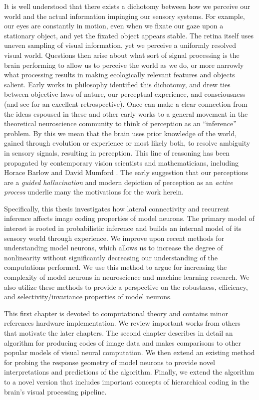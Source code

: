 It is well understood that there exists a dichotomy between how we perceive our world and the actual information impinging our sensory systems. For example, our eyes are constantly in motion, even when we fixate our gaze upon a stationary object, and yet the fixated object appears stable. The retina itself uses uneven sampling of visual information, yet we perceive a uniformly resolved visual world. Questions then arise about what sort of signal processing is the brain performing to allow us to perceive the world as we do, or more narrowly what processing results in making ecologically relevant features and objects salient. Early works in philosophy identified this dichotomy, and drew ties between objective laws of nature, our perceptual experience, and consciousness \cite{kant1790critique, helmholtz1878facts} (and see \cite{westheimer2008helmholtz} for an excellent retrospective). Once can make a clear connection from the ideas espoused in these and other early works to a general movement in the theoretical neuroscience community to think of perception as an ``inference'' problem. By this we mean that the brain uses prior knowledge of the world, gained through evolution or experience or most likely both, to resolve ambiguity in sensory signals, resulting in perception. This line of reasoning has been propagated by contemporary vision scientists and mathematicians, including Horace Barlow \citealt{barlow2001redundancy} and David Mumford \citealt{mumford1994pattern}. The early suggestion that our perceptions are a \textit{guided hallucination} and modern depiction of perception as an \textit{active process} underlie many the motivations for the work herein.

Specifically, this thesis investigates how lateral connectivity and recurrent inference affects image coding properties of model neurons. The primary model of interest is rooted in probabilistic inference and builds an internal model of its sensory world through experience. We improve upon recent methods for understanding model neurons, which allows us to increase the degree of nonlinearity without significantly decreasing our understanding of the computations performed. We use this method to argue for increasing the complexity of model neurons in neuroscience and machine learning research. We also utilize these methods to provide a perspective on the robustness, efficiency, and selectivity/invariance properties of model neurons.

This first chapter is devoted to computational theory and contains minor references hardware implementation. We review important works from others that motivate the later chapters. The second chapter describes in detail an algorithm for producing codes of image data and makes comparisons to other popular models of visual neural computation. We then extend an existing method for probing the response geometry of model neurons to provide novel interpretations and predictions of the algorithm. Finally, we extend the algorithm to a novel version that includes important concepts of hierarchical coding in the brain's visual processing pipeline.


